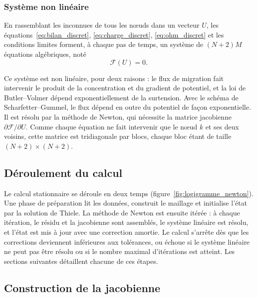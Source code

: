 \subsubsection*{Système non linéaire}

En rassemblant les inconnues de tous les nœuds dans un vecteur $U$, les
équations~\eqref{eq:bilan_discret}, \eqref{eq:charge_discret},
\eqref{eq:ohm_discret} et les conditions limites forment, à chaque pas de
temps, un système de $(N+2)M$ équations algébriques, noté
\begin{equation}
\mathcal{F}(U) = 0 .
\end{equation}

Ce système est non linéaire, pour deux raisons : le flux de migration fait
intervenir le produit de la concentration et du gradient de potentiel, et la
loi de Butler--Volmer dépend exponentiellement de la surtension. Avec le
schéma de Scharfetter--Gummel, le flux dépend en outre du potentiel de façon
exponentielle. Il est résolu par
la méthode de Newton, qui nécessite la matrice jacobienne
$\partial\mathcal{F}/\partial U$. Comme chaque équation ne fait intervenir
que le nœud $k$ et ses deux voisins, cette matrice est tridiagonale par blocs,
chaque bloc étant de taille $(N+2)\times(N+2)$.

\subsection*{Déroulement du calcul}

Le calcul stationnaire se déroule en deux temps
(figure~\ref{fig:logigramme_newton}). Une phase de préparation lit les
données, construit le maillage et initialise l'état par la solution de
Thiele. La méthode de Newton est ensuite itérée : à chaque itération, le
résidu et la jacobienne sont assemblés, le système linéaire est résolu, et
l'état est mis à jour avec une correction amortie. Le calcul s'arrête dès que
les corrections deviennent inférieures aux tolérances, ou échoue si le
système linéaire ne peut pas être résolu ou si le nombre maximal d'itérations
est atteint. Les sections suivantes détaillent chacune de ces étapes.



\subsection*{Construction de la jacobienne}


